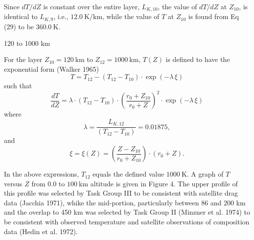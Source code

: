 \documentclass{article}
\begin{document}
Since $dT/dZ$ is constant over the entire layer, $L_{K,10}$, the value of $dT/dZ$ at $Z_{10}$, is identical to $L_{K,9}$, i.e., $12.0~\text{K/km}$, while the value of $T$ at $Z_{10}$ is found from Eq (29) to be $360.0~\text{K}$.

120 to 1000 km

For the layer $Z_{10} = 120~\text{km}$ to $Z_{12} = 1000~\text{km}$, $T(Z)$ is defined to have the exponential form (Walker 1965)
\[
T = T_{12} - (T_{12} - T_{10}) \cdot \exp(-\lambda \, \xi) \tag{31}
\]
such that
\[
\frac{dT}{dZ} = \lambda \cdot (T_{12} - T_{10}) \cdot \left(\frac{r_0 + Z_{10}}{r_0 + Z}\right)^2 \cdot \exp(-\lambda \, \xi) \tag{32}
\]
where
\[
\lambda = \frac{L_{K,12}}{(T_{12} - T_{10})} = 0.01875,
\]
and
\[
\xi = \xi(Z) = \left(\frac{Z - Z_{10}}{r_0 + Z_{10}}\right) \cdot (r_0 + Z).
\]

In the above expressions, $T_{12}$ equals the defined value $1000~\text{K}$. A graph of $T$ versus $Z$ from $0.0$ to $100~\text{km}$ altitude is given in Figure 4. The upper profile of this profile was selected by Task Group III to be consistent with satellite drag data (Jacchia 1971), whike the mid-portion, particularly between 86 and 200 km and the overlap to 450 km was selected by Task Group II (Minzner et al. 1974) to be consistent with observed temperature and satellite observations of composition data (Hedin et al. 1972).
\end{document}
